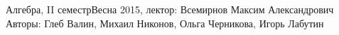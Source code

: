 


\BigHeader
	{Алгебра, II семестр}{Весна 2015, лектор: Всемирнов Максим Александрович}
	{Авторы: Глеб Валин, Михаил Никонов, Ольга Черникова, Игорь Лабутин}
	
 





